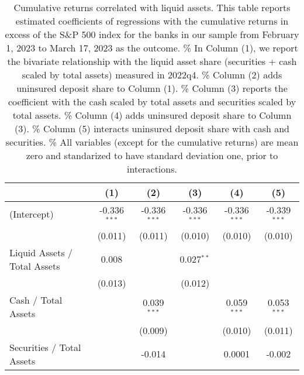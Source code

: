 
\begin{table}[htbp]
   \caption{\label{tab:liquid_assets_late} Cumulative returns correlated with liquid assets. This table reports estimated coefficients of regressions with the cumulative returns in excess of the S\&P 500 index for the banks in our sample from February 1, 2023 to March 17, 2023 as the outcome. \%
      In Column (1), we report the bivariate relationship with the liquid asset share (securities + cash scaled by total
   assets) measured in 2022q4. \%
      Column (2) adds uninsured deposit share to Column (1). \%
      Column (3) reports the coefficient with the cash scaled by total assets and securities scaled by total assets. \%
       Column (4) adds uninsured deposit share to Column (3). \%
       Column (5) interacts uninsured deposit share with cash and securities. \%
       All variables (except for the cumulative returns) are mean zero and standarized to have standard deviation one, prior to interactions.}
   \bigskip
   \centering
   \begin{adjustbox}{width = 1.2\textwidth, center}
      \begin{tabular}{lccccc}
         \toprule
                                                                     & (1)            & (2)            & (3)            & (4)            & (5)\\  
         \midrule 
         (Intercept)                                                 & -0.336$^{***}$ & -0.336$^{***}$ & -0.336$^{***}$ & -0.336$^{***}$ & -0.339$^{***}$\\   
                                                                     & (0.011)        & (0.011)        & (0.010)        & (0.010)        & (0.010)\\   
         Liquid Assets / Total Assets                                & 0.008          &                & 0.027$^{**}$   &                &   \\   
                                                                     & (0.013)        &                & (0.012)        &                &   \\   
         Cash / Total Assets                                         &                & 0.039$^{***}$  &                & 0.059$^{***}$  & 0.053$^{***}$\\   
                                                                     &                & (0.009)        &                & (0.010)        & (0.011)\\   
         Securities / Total Assets                                   &                & -0.014         &                & 0.0001         & -0.002\\   

\end{tabular}
\end{adjustbox}
\end{table}
